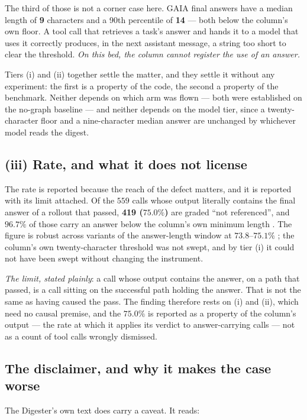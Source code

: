 The third of those is not a corner case here. GAIA final answers have a
median length of \textbf{9} characters and a 90th percentile of
\textbf{14}  --- both below the column's own floor. A tool call that
retrieves a task's answer and hands it to a model that uses it correctly
produces, in the next assistant message, a string too short to clear the
threshold. \emph{On this bed, the column cannot register the use of an
answer.}

Tiers (i) and (ii) together settle the matter, and they settle it without
any experiment: the first is a property of the code, the second a property
of the benchmark. Neither depends on which arm was flown --- both were
established on the no-graph baseline --- and neither depends on the model
tier, since a twenty-character floor and a nine-character median answer are
unchanged by whichever model reads the digest.

\subsection*{(iii) Rate, and what it does not license}

The rate is reported because the reach of the defect matters, and it is
reported with its limit attached. Of the $559$ calls whose output literally
contains the final answer of a rollout that passed, \textbf{419
($75.0\%$)} are graded ``not referenced'', and $96.7\%$ of those carry an
answer below the column's own minimum length . The figure is robust
across variants of the answer-length window at $73.8$--$75.1\%$ ;
the column's own twenty-character threshold was not swept, and by tier (i)
it could not have been swept without changing the instrument.

\emph{The limit, stated plainly}: a call whose output contains the answer,
on a path that passed, is a call sitting on the successful path holding the
answer. That is not the same as having caused the pass. The finding
therefore rests on (i) and (ii), which need no causal premise, and the
$75.0\%$ is reported as a property of the column's output --- the rate at
which it applies its verdict to answer-carrying calls --- not as a count of
tool calls wrongly dismissed.

\subsection*{The disclaimer, and why it makes the case worse}

The Digester's own text does carry a caveat. It reads:

